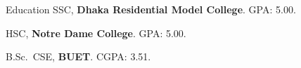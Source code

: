 \begin{rubric}{Education}
\entry*[2015 -- 2017]%
	SSC, \textbf{Dhaka Residential Model College}. GPA: 5.00.

\entry*[2017 -- 2019]%
	HSC, \textbf{Notre Dame College}. GPA: 5.00.

\entry*[2020 -- 2025]%
	B.Sc.~CSE, \textbf{BUET}. CGPA: 3.51.

\end{rubric}